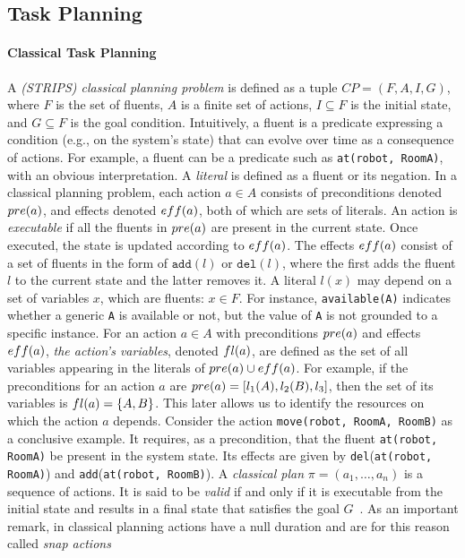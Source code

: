 \subsection{Task Planning}

\paragraph{Classical Task Planning}
\noindent A \emph{(STRIPS) classical planning problem} is defined as a tuple $CP = (F, A, I, G)$, where $F$ is the set of fluents, $A$ is a finite set of actions, $I \subseteq F$ is the initial state, and $G \subseteq F$ is the goal condition.  
Intuitively, a fluent is a predicate expressing a condition (e.g., on the system's state) that can evolve over time as a consequence of actions. For example, a fluent can be a predicate such as {\tt at(robot, RoomA)}, with an obvious interpretation.  
%
A \emph{literal} is defined as a fluent or its negation.  
%
In a classical planning problem,  each action $a \in A$ consists of preconditions denoted $pre(a)$, and effects denoted $eff(a)$, both of which are sets of literals.  
%
An action is \emph{executable} if all the fluents in $pre(a)$ are present in the current state. Once executed, the state is updated according to $eff(a)$. The effects $eff(a)$ consist of a set of fluents in the form of $\texttt{add}(l)$ or $\texttt{del}(l)$, where the first adds the fluent $l$ to the current state and the latter removes it.  
%
A literal $l(x)$ may depend on a set of variables $x$, which are fluents: $x \in F$. For instance, \texttt{available(A)} indicates whether a generic \texttt{A} is available or not, but the value of \texttt{A} is not grounded to a specific instance.  
%
For an action $a\in A$ with preconditions $pre(a)$ and effects $eff(a)$, \emph{the action’s variables}, denoted $fl(a)$, are defined as the set of all variables appearing in the literals of $pre(a) \cup eff(a)$.  
%
For example, if the preconditions for an action $a$ are $pre(a)=[l_1(A), l_2(B), l_3]$, then the set of its variables is $fl(a)=\{A, B\}$. This later allows us to identify the resources on which the action $a$ depends.  
%
Consider the action \texttt{move(robot, RoomA, RoomB)} as a conclusive example. It requires, as a precondition, that the fluent {\tt at(robot, RoomA)} be present in the system state. Its effects are given by \texttt{del}({\tt at(robot, RoomA)}) and \texttt{add}({\tt at(robot, RoomB)}).  
A \emph{classical plan} $\pi = (a_1, \dots, a_n)$ is a sequence of actions. It is said to be \emph{valid} if and only if it is executable from the initial state and results in a final state that satisfies the goal $G$~\cite{ghallab03}. As an important remark, in classical planning actions have a null duration and are for
this reason called \emph{snap actions}


